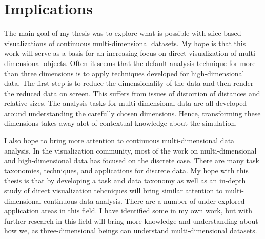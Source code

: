 
\section{Implications}

The main goal of my thesis was to explore what is possible with slice-based
visualizations of continuous multi-dimensional datasets. My hope is that this
work will serve as a basis for an increasing focus on direct visualization of
multi-dimensional objects. Often it seems that the default analysis technique
for more than three dimensions is to apply techniques developed for
high-dimensional data. The first step is to reduce the dimensionality of the
data and then render the reduced data on screen. This suffers from issues of
distortion of distances and relative sizes. The analysis tasks for
multi-dimensional data are all developed around understanding the carefully
chosen dimensions. Hence, transforming these dimensions takes away alot of
contextual knowledge about the simulation. 

I also hope to bring more attention to continuous multi-dimensional data analysis.
In the visualization community, most of the work on multi-dimensional and high-dimensional
data has focused on the discrete case. There are many task taxonomies, techniques,
and applications for discrete data. My hope with this thesis is that by developing
a task and data taxonomy as well as an in-depth study of direct visualization
tehcniques will bring similar attention to multi-dimensional continuous data
analysis. There are a number of under-explored application areas in this
field. I have identified some in my own work, but with further research in this
field will bring more knowledge and understanding about how we, as three-dimensional
beings can understand multi-dimensional datasets.





